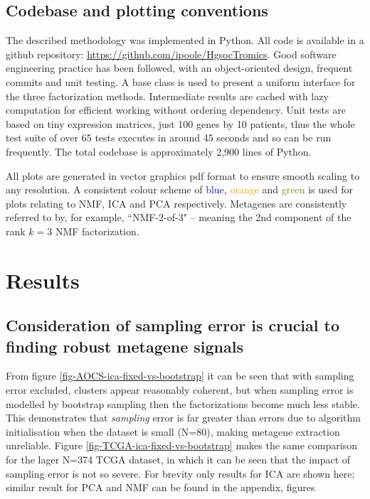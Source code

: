 \documentclass[draft,tikz, 12pt,a4paper,oneside,fleqn]{article}
\begin{document}
\subsection{Codebase and plotting conventions}

The described methodology was implemented in Python.
All code is available in a github repository: \url{https://github.com/ipoole/HgsocTromics}.  Good software engineering practice has been followed, with an object-oriented design, frequent commits and unit testing.  A base class is used to present a uniform interface for the three factorization methods.  Intermediate results are cached with lazy computation for efficient working without ordering dependency.  Unit tests are based on tiny expression matrices, just 100 genes by 10 patients, thus the whole test suite of over 65 tests executes in around 45 seconds and so can be run frequently.  The total codebase is approximately 2,900 lines of Python.  

All plots are generated in vector graphics pdf format to ensure smooth scaling to any resolution.  A consistent colour scheme of \textcolor{blue}{blue}, \textcolor{orange}{orange} and \textcolor{olive}{green} is used for plots relating to NMF, ICA and PCA respectively.  Metagenes are consistently referred to by, for example, ``NMF-2-of-3" -- meaning the 2nd component of the rank $k=3$ NMF factorization.


\clearpage

\section{Results}


\subsection{Consideration of sampling error is crucial to finding robust metagene signals}

From figure \ref{fig-AOCS-ica-fixed-vs-bootstrap} it can be seen that with sampling error excluded, clusters appear reasonably coherent, but when sampling error is modelled by bootstrap sampling then  the factorizations become much less stable.  This demonstrates that \emph{sampling} error is far greater than errors due to algorithm initialisation when the dataset is small (N=80), making metagene extraction unreliable.   Figure  \ref{fig-TCGA-ica-fixed-vs-bootstrap} makes the same comparison for the lager N=374 TCGA dataset, in which it can be seen that the impact of sampling error is not so severe.  For brevity only results for ICA are shown here; similar result for PCA and NMF can be found in the appendix, figures
\end{document}
